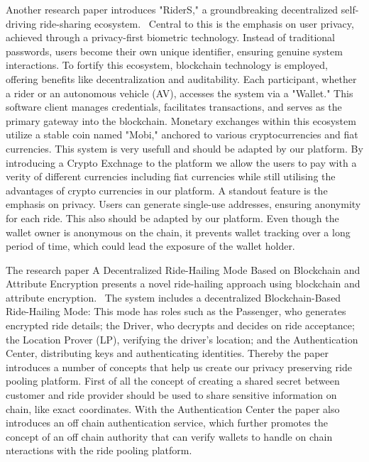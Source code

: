 Another research paper introduces "RiderS," a groundbreaking decentralized self-driving ride-sharing ecosystem. ~\cite{Bathen.}Central to this is the emphasis on user privacy, achieved through a privacy-first biometric technology. Instead of traditional passwords, users become their own unique identifier, ensuring genuine system interactions. To fortify this ecosystem, blockchain technology is employed, offering benefits like decentralization and auditability. Each participant, whether a rider or an autonomous vehicle (AV), accesses the system via a "Wallet." This software client manages credentials, facilitates transactions, and serves as the primary gateway into the blockchain. Monetary exchanges within this ecosystem utilize a stable coin named "Mobi," anchored to various cryptocurrencies and fiat currencies. This system is very usefull and should be adapted by our platform. By introducing a Crypto Exchnage to the platform we allow the users to pay with a verity of different currencies including fiat currencies while still utilising the advantages of crypto currencies   in our platform. A standout feature is the emphasis on privacy. Users can generate single-use addresses, ensuring anonymity for each ride. This also should be adapted by our platform. Even though the wallet owner is anonymous on the chain, it prevents wallet tracking over a long period of time, which could lead the exposure of the wallet holder.

The research paper A Decentralized Ride-Hailing Mode Based on Blockchain and Attribute Encryption presents a novel ride-hailing approach using blockchain and attribute encryption.~\cite{Zhang.} 
The system includes a decentralized Blockchain-Based Ride-Hailing Mode: This mode has roles such as the Passenger, who generates encrypted ride details; the Driver, who decrypts and decides on ride acceptance; the Location Prover (LP), verifying the driver's location; and the Authentication Center, distributing keys and authenticating identities. Thereby the paper introduces a number of concepts that help us create our privacy preserving ride pooling platform. First of all the concept of creating a shared secret between customer and ride provider should be used  to share sensitive information on chain, like exact coordinates. With the  Authentication Center the paper also introduces an off chain authentication service, which further promotes the concept of an off chain authority that can verify  wallets to handle on chain nteractions with the ride pooling platform.

